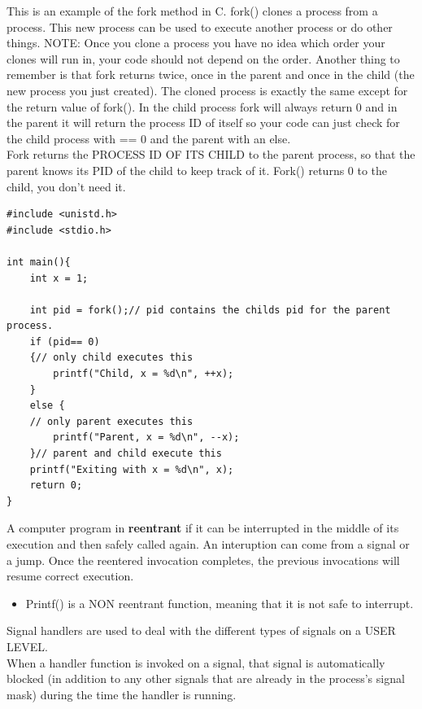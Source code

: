 \documentclass[15pt,idxtotoc,hyperref,openany]{labbook} %
\begin{document}
 \newpage
{}

This is an example of the fork method in C.  fork() clones a process from a process.  This new process can be used to execute another process or
do other things.  NOTE:  Once you clone a process you have no idea which order your clones will run in, your code should not depend on the order.  Another thing to remember is that fork returns twice, once in the parent and once in the child (the new process you just created).  The cloned process is exactly the same except for the return value of fork().  In the child process fork will always return 0 and in the parent it will return the process ID of itself so your code can just check for the child process with == 0 and the parent with an else.\\

Fork returns the PROCESS ID OF ITS CHILD to the parent process, so that the parent knows its PID of the child to keep track of it.  Fork() returns 0 to the child, you don't need it.
\begin{lstlisting}
#include <unistd.h>
#include <stdio.h>

int main(){
	int x = 1;
	
	int pid = fork();// pid contains the childs pid for the parent process.
	if (pid== 0) 
	{// only child executes this
		printf("Child, x = %d\n", ++x);
	} 
	else {
	// only parent executes this
		printf("Parent, x = %d\n", --x);
	}// parent and child execute this
	printf("Exiting with x = %d\n", x);
	return 0;
}
\end{lstlisting}



A computer program in {\bf reentrant} if it can be interrupted in the middle of its execution and then safely called again.  An interuption can come from a signal or a jump.  Once the reentered invocation completes, the previous invocations will resume correct execution.

\begin{itemize}
\item Printf() is a NON reentrant function, meaning that it is not safe to interrupt.
\end{itemize}

Signal handlers are used to deal with the different types of signals on a USER LEVEL.\\

When a handler function is invoked on a signal, that signal is automatically blocked (in addition to any other signals that are already in the process's signal mask) during the time the handler is running. \\
\end{document}
